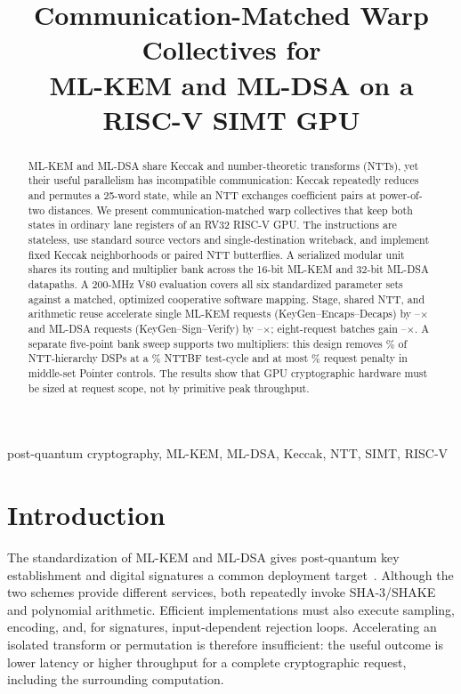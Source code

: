 \documentclass[conference,letterpaper]{IEEEtran}
\title{Communication-Matched Warp Collectives for\\
ML-KEM and ML-DSA on a RISC-V SIMT GPU}
\author{\IEEEauthorblockN{Anonymous Authors}}
\begin{document}
\maketitle

\begin{abstract}
ML-KEM and ML-DSA share Keccak and number-theoretic transforms (NTTs), yet
their useful parallelism has incompatible communication: Keccak repeatedly
reduces and permutes a 25-word state, while an NTT exchanges coefficient pairs
at power-of-two distances. We present communication-matched warp collectives
that keep both states in ordinary lane registers of an RV32 RISC-V GPU. The
instructions are stateless, use standard source vectors and single-destination
writeback, and implement fixed Keccak neighborhoods or paired NTT butterflies.
A serialized modular unit shares its routing and multiplier bank across the
16-bit ML-KEM and 32-bit ML-DSA datapaths. A 200-MHz V80 evaluation covers all
six standardized parameter sets against a matched, optimized cooperative
software mapping. Stage, shared NTT, and arithmetic reuse accelerate single
ML-KEM requests (KeyGen--Encaps--Decaps) by
\KemParameterMinOne{}--\KemParameterMaxOne{}$\times$ and ML-DSA requests
(KeyGen--Sign--Verify) by \DsaParameterMinOne{}--\DsaParameterMaxOne{}$\times$;
eight-request batches gain \ParameterMinEight{}--\ParameterMaxEight{}$\times$.
A separate five-point bank sweep supports two multipliers: this design removes
\BankTwoNttDspSaved{}\% of NTT-hierarchy DSPs at a
\BankTwoNttPenalty{}\% NTTBF test-cycle and at most
\BankTwoEndToEndMax{}\% request penalty in middle-set Pointer controls. The results show that GPU
cryptographic hardware must be sized at request scope, not by primitive peak
throughput.
\end{abstract}

\begin{IEEEkeywords}
post-quantum cryptography, ML-KEM, ML-DSA, Keccak, NTT, SIMT, RISC-V
\end{IEEEkeywords}

\section{Introduction}
The standardization of ML-KEM and ML-DSA gives post-quantum key establishment
and digital signatures a common deployment target~\cite{fips203,fips204}.
Although the two schemes provide different services, both repeatedly invoke
SHA-3/SHAKE and polynomial arithmetic. Efficient implementations must also
execute sampling, encoding, and, for signatures, input-dependent rejection
loops. Accelerating an isolated transform or permutation is therefore
insufficient: the useful outcome is lower latency or higher throughput for a
complete cryptographic request, including the surrounding computation.
\end{document}

